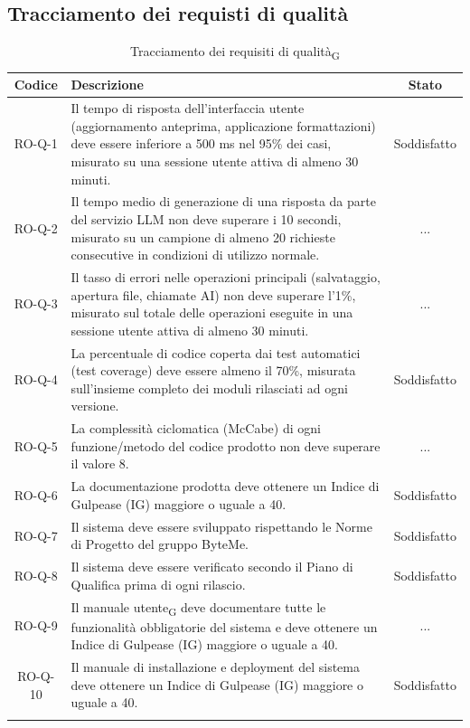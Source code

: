 \documentclass[11pt,a4paper]{article}
\newcommand{\gls}[1]{#1\textsubscript{G}}
\begin{document}
\subsection{Tracciamento dei requisti di qualità}
\begin{longtable}{|c|p{11cm}|c|}
\hline
\textbf{Codice} & \textbf{Descrizione} & \textbf{Stato}\\
\hline
\endhead
RO-Q-1 & Il tempo di risposta dell'interfaccia utente (aggiornamento anteprima, applicazione formattazioni) deve essere inferiore a 500 ms nel 95\% dei casi, misurato su una sessione utente attiva di almeno 30 minuti. & Soddisfatto \\
\hline
RO-Q-2 & Il tempo medio di generazione di una risposta da parte del servizio LLM non deve superare i 10 secondi, misurato su un campione di almeno 20 richieste consecutive in condizioni di utilizzo normale.  & ... \\
\hline
RO-Q-3 & Il tasso di errori nelle operazioni principali (salvataggio, apertura file, chiamate AI) non deve superare l'1\%, misurato sul totale delle operazioni eseguite in una sessione utente attiva di almeno 30 minuti. & ... \\
\hline
RO-Q-4 & La percentuale di codice coperta dai test automatici (test coverage) deve essere almeno il 70\%, misurata sull'insieme completo dei moduli rilasciati ad ogni versione. & Soddisfatto \\
\hline
RO-Q-5 & La complessità ciclomatica (McCabe) di ogni funzione/metodo del codice prodotto non deve superare il valore 8. & ... \\
\hline
RO-Q-6 & La documentazione prodotta deve ottenere un Indice di Gulpease (IG) maggiore o uguale a 40. & Soddisfatto \\
\hline
RO-Q-7 & Il sistema deve essere sviluppato rispettando le Norme 
di Progetto del gruppo ByteMe. & Soddisfatto \\
\hline
RO-Q-8 & Il sistema deve essere verificato secondo il Piano di Qualifica prima di ogni rilascio. & Soddisfatto\\
\hline
RO-Q-9 & Il \gls{manuale utente} deve documentare tutte le funzionalità obbligatorie del sistema e deve ottenere un Indice di Gulpease (IG) maggiore o uguale a 40. & ... \\
\hline
RO-Q-10 & Il manuale di installazione e deployment del sistema deve ottenere un Indice di Gulpease (IG) maggiore o uguale a 40. & Soddisfatto \\
\hline
\addlinespace[1em]
\caption{Tracciamento dei \gls{requisiti di qualità}}
\label{tab:tracciamento_requisiti_qualità}
\end{longtable}
\end{document}
